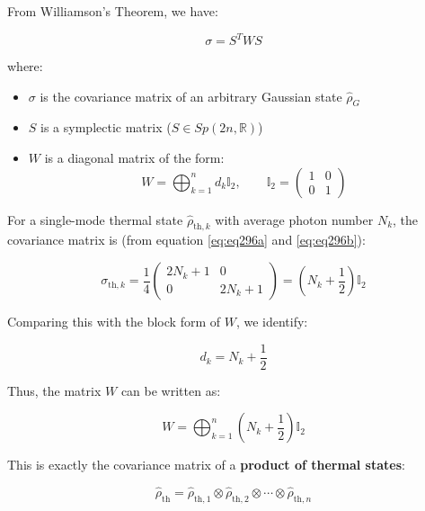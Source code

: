 From Williamson's Theorem, we have:

\begin{equation}
    \sigma = S^T W S
    \label{eq:nfd1}
\end{equation}

where:
\begin{itemize}
    \item $\sigma$ is the covariance matrix of an arbitrary Gaussian state $\hat{\rho}_G$
    \item $S$ is a symplectic matrix ($S \in Sp(2n, \mathbb{R})$)
    \item $W$ is a diagonal matrix of the form:
    \begin{equation}
        W = \bigoplus_{k=1}^{n} d_k \mathbb{I}_2, \qquad \mathbb{I}_2 = \begin{pmatrix} 1 & 0 \\ 0 & 1 \end{pmatrix}
    \end{equation}
\end{itemize}

For a single-mode thermal state $\hat{\rho}_{\text{th},k}$ with average photon number $N_k$, the covariance matrix is (from equation \ref{eq:eq296a} and \ref{eq:eq296b}):

\begin{equation}
    \sigma_{\text{th},k} = \frac{1}{4} \begin{pmatrix} 2N_k + 1 & 0 \\ 0 & 2N_k + 1 \end{pmatrix} = \left(N_k + \frac{1}{2}\right) \mathbb{I}_2
\end{equation}

Comparing this with the block form of $W$, we identify:

\begin{equation}
    d_k = N_k + \frac{1}{2}
\end{equation}

Thus, the matrix $W$ can be written as:

\begin{equation}
    W = \bigoplus_{k=1}^{n} \left(N_k + \frac{1}{2}\right) \mathbb{I}_2
\end{equation}

This is exactly the covariance matrix of a \textbf{product of thermal states}:

\begin{equation}
    \hat{\rho}_{\text{th}} = \hat{\rho}_{\text{th},1} \otimes \hat{\rho}_{\text{th},2} \otimes \cdots \otimes \hat{\rho}_{\text{th},n}
\end{equation}

